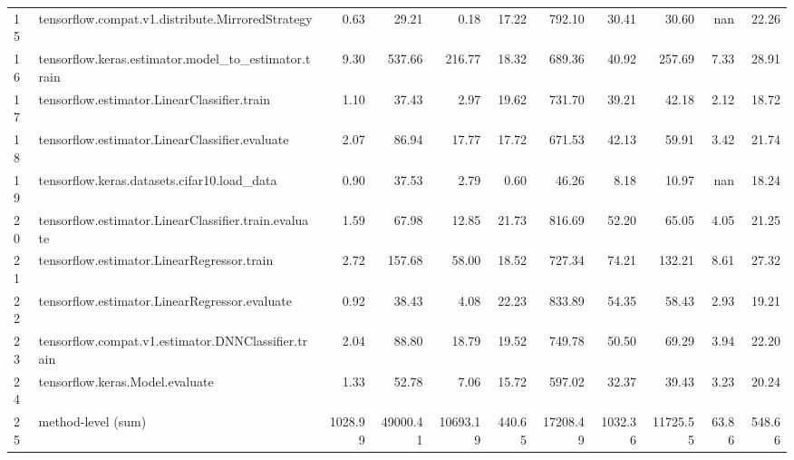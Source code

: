 \begin{tabular}{llrrrrrrrrr}
15 & tensorflow.compat.v1.distribute.MirroredStrategy & 0.63 & 29.21 & 0.18 & 17.22 & 792.10 & 30.41 & 30.60 & nan & 22.26 \\
16 & tensorflow.keras.estimator.model_to_estimator.train & 9.30 & 537.66 & 216.77 & 18.32 & 689.36 & 40.92 & 257.69 & 7.33 & 28.91 \\
17 & tensorflow.estimator.LinearClassifier.train & 1.10 & 37.43 & 2.97 & 19.62 & 731.70 & 39.21 & 42.18 & 2.12 & 18.72 \\
18 & tensorflow.estimator.LinearClassifier.evaluate & 2.07 & 86.94 & 17.77 & 17.72 & 671.53 & 42.13 & 59.91 & 3.42 & 21.74 \\
19 & tensorflow.keras.datasets.cifar10.load_data & 0.90 & 37.53 & 2.79 & 0.60 & 46.26 & 8.18 & 10.97 & nan & 18.24 \\
20 & tensorflow.estimator.LinearClassifier.train.evaluate & 1.59 & 67.98 & 12.85 & 21.73 & 816.69 & 52.20 & 65.05 & 4.05 & 21.25 \\
21 & tensorflow.estimator.LinearRegressor.train & 2.72 & 157.68 & 58.00 & 18.52 & 727.34 & 74.21 & 132.21 & 8.61 & 27.32 \\
22 & tensorflow.estimator.LinearRegressor.evaluate & 0.92 & 38.43 & 4.08 & 22.23 & 833.89 & 54.35 & 58.43 & 2.93 & 19.21 \\
23 & tensorflow.compat.v1.estimator.DNNClassifier.train & 2.04 & 88.80 & 18.79 & 19.52 & 749.78 & 50.50 & 69.29 & 3.94 & 22.20 \\
24 & tensorflow.keras.Model.evaluate & 1.33 & 52.78 & 7.06 & 15.72 & 597.02 & 32.37 & 39.43 & 3.23 & 20.24 \\
25 & method-level (sum) & 1028.99 & 49000.41 & 10693.19 & 440.65 & 17208.49 & 1032.36 & 11725.55 & 63.86 & 548.66 \\
\end{tabular}
